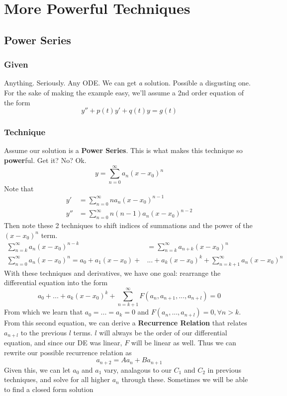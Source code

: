 \documentclass[11pt]{article}
\begin{document}
\section{More Powerful Techniques}
\subsection{Power Series}
\subsubsection{Given}
Anything. Seriously. Any ODE. We can get \textit{a} solution. Possible a disgusting one. For the
sake of making the example easy, we'll assume a 2nd order equation of the form
    \[ y'' + p(t)y' + q(t)y = g(t) \] 
\subsubsection{Technique}
Assume our solution is a \textbf{Power Series}. This is what makes this technique so \textbf{power}ful.
Get it? No? Ok. 
    \[ y = \sum_{n=0}^{\infty}a_n(x - x_0)^n \]
Note that 
\begin{align*}
    y' &= \sum_{n=0}^{\infty}na_n(x - x_0)^{n-1} \\
    y'' &= \sum_{n=0}^{\infty}n(n-1)a_n(x - x_0)^{n-2}
\end{align*}
Then note these 2 techniques to shift indices of summations and the power of the $(x-x_0)^n$ term.
\begin{align}
    \sum_{n=k}^{\infty} a_n (x - x_0)^{n-k} &= \sum_{n=k}^{\infty} a_{n+k} (x - x_0)^n \\
    \sum_{n=0}^{\infty} a_n (x - x_0)^n = a_0 + a_1(x - x_0) + &... + a_k(x - x_0)^k + \sum_{n=k+1}^{\infty} a_n (x - x_0)^n
\end{align}
With these techniques and derivatives, we have one goal: rearrange the differential equation into the 
form
\[ a_0 + ... + a_k(x - x_0)^k + \sum_{n=k+1}^{\infty} F(a_n, a_{n+1}, ..., a_{n+l}) = 0 \]
From which we learn that $a_0 = ... = a_k = 0$ and $F(a_n,..., a_{n+l}) = 0, \forall n > k$. From this
second equation, we can derive a \textbf{Recurrence Relation} that relates $a_{n+l}$ to the previous 
$l$ terms. $l$ will always be the order of our differential equation, and since our DE was linear, 
$F$ will be linear as well. Thus we can rewrite our possible recurrence relation as
    \[ a_{n+2} = A a_n + B a_{n+1} \]
Given this, we can let $a_0$ and $a_1$ vary, analagous to our $C_1$ and $C_2$ in previous techniques,
and solve for all higher $a_n$ through these. Sometimes we will be able to find a closed form solution
\end{document}
